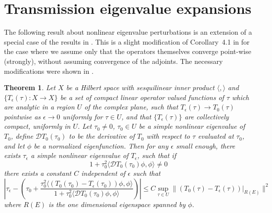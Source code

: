 \documentclass[12pt]{article}
\newtheorem{theorem}{Theorem}
\begin{document}
\section{Transmission eigenvalue expansions} 
The following result about nonlinear eigenvalue perturbations is an extension of a special case of the results in \cite{Os}. This is a slight modification of Corollary~4.1 in \cite{Mo} for the case where we assume only that the operators themselves converge point-wise (strongly), without assuming convergence of the adjoints. The necessary modifications were shown in \cite{FuMo}.  \begin{theorem}
\label{Osbornnonlinear}
Let $X$ be a Hilbert space with sesquilinear inner product $\langle, \rangle$ and $ \{T_\epsilon(\tau):X \rightarrow X\}$ be a set of compact linear operator valued functions of $\tau$ which are analytic in a region $U$ of the complex plane, such that $T_\epsilon(\tau)\rightarrow T_0(\tau)$ pointwise as $\epsilon \rightarrow 0$ uniformly for $\tau \in U$, and that $\{ T_\epsilon(\tau)\}$ are collectively compact, uniformly in $U$.  Let $\tau_0 \neq0$, 
$\tau_0 \in U$ be a simple nonlinear eigenvalue of $T_0$, define ${\mathcal D}T_0(\tau_0)$ to be the derivative of $T_0$ with respect to $\tau$ evaluated at $\tau_0$, and let $\phi$ be a normalized eigenfunction. Then for any $\epsilon$ small enough, there exists $\tau_\epsilon$ a simple nonlinear eigenvalue of $T_\epsilon$, such that if
\begin{equation*}
1+\tau_{0}^2\langle {\mathcal D}T_0(\tau_0) \phi,\phi \rangle \neq 0
\end{equation*}
there exists a constant $C$ independent of $\epsilon$ such that   
\begin{equation}\label{eq:lmh}
\left| \tau_\epsilon - \left(\tau_0+ \dfrac{\tau_{0}^2\langle \left(T_0(\tau_0)-T_\epsilon(\tau_0)\right) \phi,\phi \rangle}{1+ \tau_0^2\langle {\mathcal D}T_0(\tau_0) \phi,\phi \rangle} \right)\right| \leq 
 C \sup_{\tau \in U}\|  (T_0(\tau)-T_\epsilon(\tau))|_{R(E)}\|^2
\end{equation}
where $R(E)$ is the one dimensional eigenspace spanned by $\phi$. 
\end{theorem}
\end{document}
